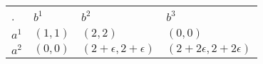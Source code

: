 \begin{center}
    \begin{tabular}{llll}
    .                          & $b^1$    & $b^2$                      & $b^3$                           \\ \cline{2-4}
    \multicolumn{1}{l|}{$a^1$} & $(1, 1)$ & $(2, 2)$                   & \multicolumn{1}{l|}{$(0, 0)$} \\
    \multicolumn{1}{l|}{$a^2$} & $(0, 0)$ & $(2+\epsilon, 2+\epsilon)$ & \multicolumn{1}{l|}{$(2+2\epsilon, 2+2\epsilon)$} \\ \cline{2-4}
    \end{tabular}
\end{center}